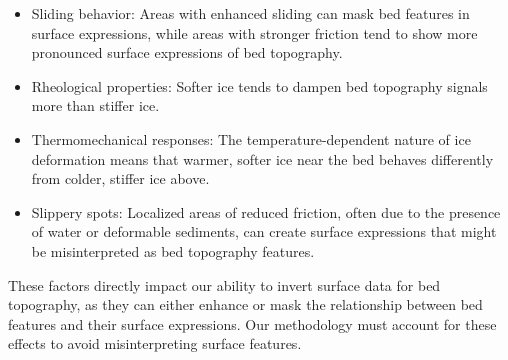 \begin{itemize}
    \item Sliding behavior: Areas with enhanced sliding can mask bed features in surface expressions, while areas with stronger friction tend to show more pronounced surface expressions of bed topography.
    
    \item Rheological properties: Softer ice tends to dampen bed topography signals more than stiffer ice.
    
    \item Thermomechanical responses: The temperature-dependent nature of ice deformation means that warmer, softer ice near the bed behaves differently from colder, stiffer ice above.
    
    \item Slippery spots: Localized areas of reduced friction, often due to the presence of water or deformable sediments, can create surface expressions that might be misinterpreted as bed topography features.
\end{itemize}

These factors directly impact our ability to invert surface data for bed topography, as they can either enhance or mask the relationship between bed features and their surface expressions. Our methodology must account for these effects to avoid misinterpreting surface features.

